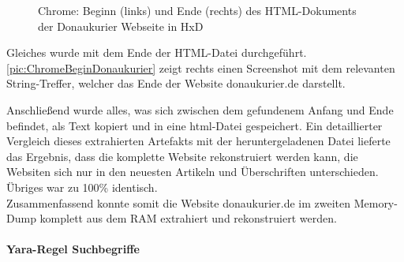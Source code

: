 \begin{figure}[h!]
	\centering
	\hfill
	\caption{Chrome: Beginn (links) und Ende (rechts) des HTML-Dokuments der Donaukurier Webseite in HxD}
	\label{pic:ChromeBeginDonaukurier}
\end{figure}

Gleiches wurde mit dem Ende der HTML-Datei durchgeführt. \autoref{pic:ChromeBeginDonaukurier} zeigt rechts einen Screenshot mit dem relevanten String-Treffer, welcher das Ende der Website donaukurier.de darstellt.

Anschließend wurde alles, was sich zwischen dem gefundenem Anfang und Ende befindet, als Text kopiert und in eine html-Datei gespeichert. Ein detaillierter Vergleich dieses extrahierten Artefakts mit der heruntergeladenen Datei lieferte das Ergebnis, dass die komplette Website rekonstruiert werden kann, die Websiten sich nur in den neuesten Artikeln und Überschriften unterschieden. Übriges war zu 100\% identisch. \\
Zusammenfassend konnte somit die Website \glqq{}donaukurier.de\grqq{} im zweiten Memory-Dump komplett aus dem RAM extrahiert und rekonstruiert werden.

\paragraph*{Yara-Regel \glqq{}Suchbegriffe\grqq{}}\label{chap:ergebnisse-chrome-uncommon-volatility-suchbegriffe}

